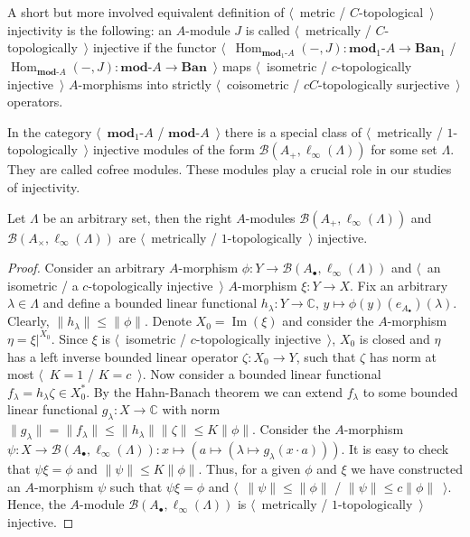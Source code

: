 A short but more involved equivalent definition 
of $\langle$~metric / $C$-topological~$\rangle$ injectivity is the following: 
an $A$-module $J$ is called $\langle$~metrically / $C$-topologically~$\rangle$ 
injective if the functor
$\langle$~$\operatorname{Hom}_{\mathbf{mod}_1\text{-}A}(-,J)
:\mathbf{mod}_1\text{-}A\to\mathbf{Ban}_1$
/
$\operatorname{Hom}_{\mathbf{mod}\text{-}A}(-,J)
:\mathbf{mod}\text{-}A\to\mathbf{Ban}$~$\rangle$
maps $\langle$~isometric / $c$-topologically injective~$\rangle$
$A$-morphisms into strictly $\langle$~coisometric / 
$c C$-topologically surjective~$\rangle$ operators. 

In the category $\langle$~$\mathbf{mod}_1\text{-}A$ / $\mathbf{mod}\text{-}A$~$\rangle$ there
is a special class of $\langle$~metrically / $1$-topologically~$\rangle$
injective modules of the form $\mathcal{B}(A_+, \ell_\infty(\Lambda))$ for 
some set $\Lambda$. They are called cofree modules. These modules play a crucial 
role in our studies of injectivity.

\begin{proposition}\label{MetCTopCofreeMod} Let $\Lambda$ be an arbitrary 
set, then the right $A$-modules $\mathcal{B}(A_+, \ell_\infty(\Lambda))$ 
and $\mathcal{B}(A_\times, \ell_\infty(\Lambda))$
are $\langle$~metrically / $1$-topologically~$\rangle$ injective. 
\end{proposition}
\begin{proof}
Consider an arbitrary $A$-morphism 
$\phi:Y\to \mathcal{B}(A_\bullet, \ell_\infty(\Lambda))$ and 
$\langle$~an isometric / a $c$-topologically injective~$\rangle$ 
$A$-morphism $\xi:Y\to X$. Fix an arbitrary $\lambda\in\Lambda$ and define 
a bounded linear functional 
$h_\lambda:Y\to\mathbb{C},\, y\mapsto \phi(y)(e_{A_\bullet})(\lambda)$. 
Clearly, $\lVert h_\lambda\rVert\leq\lVert \phi\rVert$.
Denote $X_0=\operatorname{Im}(\xi)$ and consider 
the $A$-morphism $\eta=\xi|^{X_0}$. Since $\xi$ is 
$\langle$~isometric / $c$-topologically injective~$\rangle$, $X_0$ is
closed and $\eta$ has a left inverse bounded linear operator $\zeta:X_0\to Y$, 
such that $\zeta$ has norm at most $\langle$~$K=1$ / $K=c$~$\rangle$. 
Now consider a bounded linear functional  $f_\lambda=h_\lambda\zeta\in X_0^*$. 
By the Hahn-Banach theorem we can extend $f_\lambda$ to some bounded linear functional
$g_\lambda:X\to\mathbb{C}$ with norm  
$\lVert g_\lambda\rVert
=\lVert f_\lambda\rVert
\leq\lVert h_\lambda\rVert\lVert\zeta\rVert
\leq K\lVert \phi\rVert$. 
Consider the $A$-morphism 
$\psi
:X\to \mathcal{B}(A_\bullet, \ell_\infty(\Lambda))
:x\mapsto (a\mapsto (\lambda\mapsto g_\lambda(x\cdot a)))$. 
It is easy to check that $\psi\xi=\phi$ and 
$\lVert\psi\rVert\leq K\lVert\phi\rVert$. Thus, for a given $\phi$ 
and $\xi$ we have constructed an $A$-morphism $\psi$ such that $\psi\xi=\phi$ 
and $\langle$~$\lVert\psi\rVert\leq\lVert\phi\rVert$ /
$\lVert\psi\rVert\leq c\lVert\phi\rVert$~$\rangle$. Hence, the 
$A$-module $\mathcal{B}(A_\bullet, \ell_\infty(\Lambda))$ is 
$\langle$~metrically / $1$-topologically~$\rangle$ injective.
\end{proof}


